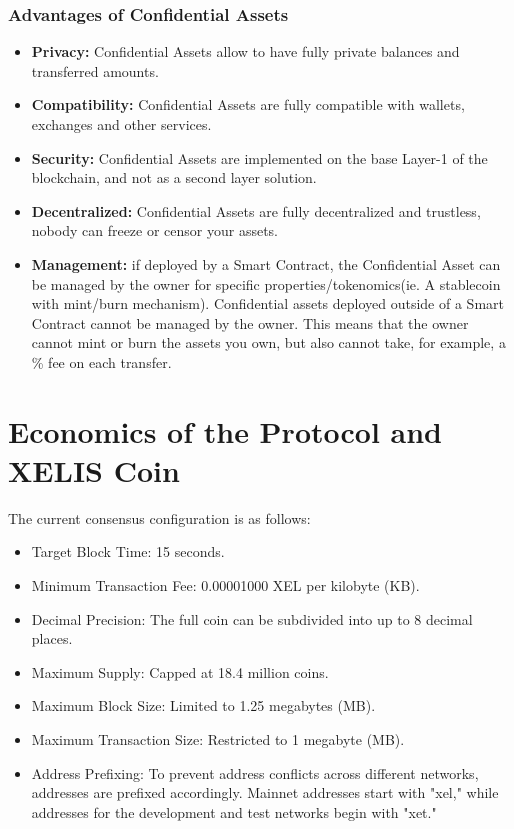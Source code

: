\documentclass[10pt,a4paper,twocolumn]{article}
\begin{document}
\subsubsection{Advantages of Confidential Assets}
\begin{itemize}
\item \textbf{Privacy:} Confidential Assets allow to have fully private balances and transferred amounts.\\

\item \textbf{Compatibility:} Confidential Assets are fully compatible with wallets, exchanges and other services.\\

\item \textbf{Security:} Confidential Assets are implemented on the base Layer-1 of the blockchain, and not as a second layer solution.\\

\item \textbf{Decentralized:} Confidential Assets are fully decentralized and trustless, nobody can freeze or censor your assets.\\

\item \textbf{Management:} if deployed by a Smart Contract, the Confidential Asset can be managed by the owner for specific properties/tokenomics(ie. A stablecoin with mint/burn mechanism). Confidential assets deployed outside of a Smart Contract cannot be managed by the owner. This means that the owner cannot mint or burn the assets you own, but also cannot take, for example, a \% fee on each transfer.\\
\end{itemize}

\section{Economics of the Protocol and XELIS Coin}

The current consensus configuration is as follows:

\begin{itemize}
    \item Target Block Time: 15 seconds.
    \item Minimum Transaction Fee: 0.00001000 XEL per kilobyte (KB).
    \item Decimal Precision: The full coin can be subdivided into up to 8 decimal places.
    \item Maximum Supply: Capped at 18.4 million coins.
    \item Maximum Block Size: Limited to 1.25 megabytes (MB).
    \item Maximum Transaction Size: Restricted to 1 megabyte (MB).
    \item Address Prefixing: To prevent address conflicts across different networks, addresses are prefixed accordingly. Mainnet addresses start with "xel," while addresses for the development and test networks begin with "xet."
\end{itemize}
\end{document}
